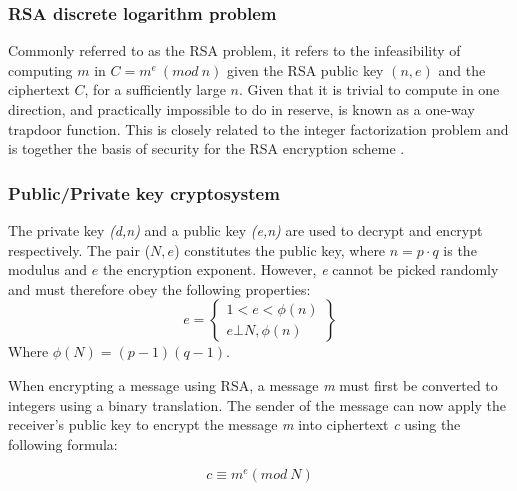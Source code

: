\subsubsection{RSA discrete logarithm problem}
Commonly referred to as the RSA problem\cite{RSAProblem}, it refers to the infeasibility of computing $m$ in $C=m^e ~ (mod ~ n)$ given the RSA public key $(n,e)$ and the ciphertext $C$, for a sufficiently large $n$. Given that it is trivial to compute in one direction, and practically impossible to do in reserve, is known as a one-way trapdoor function. This is closely related to the integer factorization problem and is together the basis of security for the RSA encryption scheme . 


\subsubsection{Public/Private key cryptosystem}
The private key \textit{(d,n)} and a public key \textit{(e,n)} are used to decrypt and encrypt respectively. The pair ($N,e$) constitutes the public key, where $n=p \cdot q$ is the modulus and $e$ the encryption exponent. However, \textit{e} cannot be picked randomly and must therefore obey the following properties: 
\[e=\begin{Bmatrix}
1 < e < \phi (n)   \\
e \bot N, \phi (n)
\end{Bmatrix}
\]
Where $\phi (N) = (p-1)(q-1)$.

When encrypting a message using RSA, a message \textit{m} must first be converted to integers using a binary translation.%
The sender of the message can now apply the receiver's public key to encrypt the message \textit{m} into ciphertext \textit{c} using the following formula:

$$c \equiv m^{e}(mod ~ N)$$

